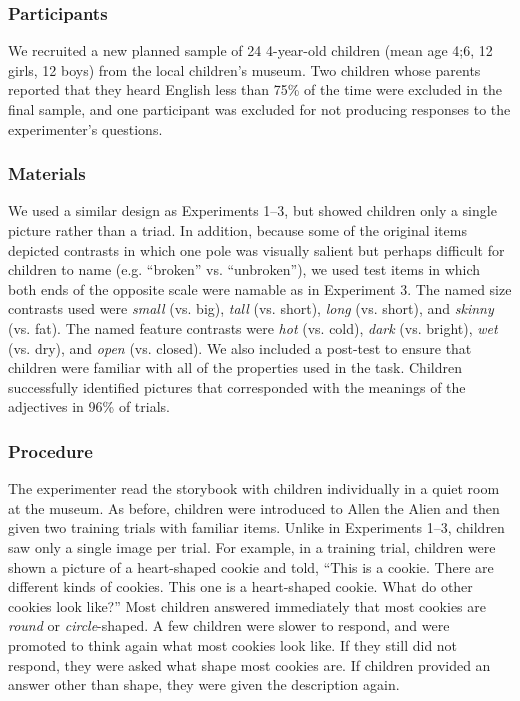 \documentclass[man]{apa2}
\begin{document}
\subsubsection{Participants}

We recruited a new planned sample of 24 4-year-old children (mean age 4;6, 12 girls, 12 boys) from the local children's museum.  Two children whose parents reported that they heard English less than 75\% of the time were excluded in the final sample, and one participant was excluded for not producing responses to the experimenter's questions.

\subsubsection{Materials}

We used a similar design as Experiments 1--3, but showed children only a single picture rather than a triad.  In addition, because some of the original items depicted contrasts in which one pole was visually salient but perhaps difficult for children to name (e.g. ``broken'' vs. ``unbroken''), we used test items in which both ends of the opposite scale were namable as in Experiment 3. The named size contrasts used were \emph{small} (vs. big), \emph{tall} (vs. short), \emph{long} (vs. short), and \emph{skinny} (vs. fat).  The named feature contrasts were \emph{hot} (vs. cold), \emph{dark} (vs. bright), \emph{wet} (vs. dry), and \emph{open} (vs. closed).  We also included a post-test to ensure that children were familiar with all of the properties used in the task.  Children successfully identified pictures that corresponded with the meanings of the adjectives in 96\% of trials.

\subsubsection{Procedure}

The experimenter read the storybook with children individually in a quiet room at the museum. As before, children were introduced to Allen the Alien and then given two training trials with familiar items. Unlike in  Experiments 1--3, children saw only a single image per trial. For example, in a training trial, children were shown a picture of a heart-shaped cookie and told, ``This is a cookie.  There are different kinds of cookies.  This one is a heart-shaped cookie.  What do other cookies look like?'' Most children answered immediately that most cookies are \emph{round} or \emph{circle}-shaped. A few children were slower to respond, and were promoted to think again what most cookies look like. If they still did not respond, they were asked what shape most cookies are.  If children provided an answer other than shape, they were given the description again.
\end{document}
